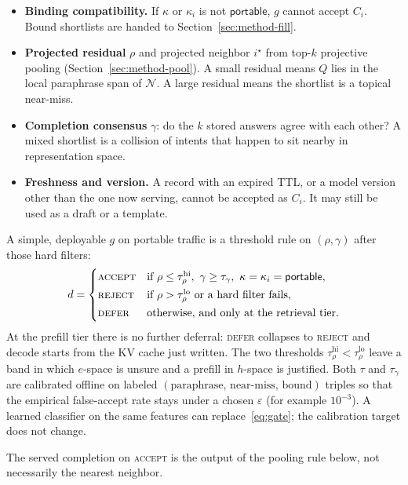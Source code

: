 \begin{itemize}
  \item \textbf{Binding compatibility.} If $\kappa$ or $\kappa_i$ is not $\mathsf{portable}$, $g$ cannot accept $C_i$. Bound shortlists are handed to Section~\ref{sec:method-fill}.
  \item \textbf{Projected residual} $\rho$ and projected neighbor $i^\star$ from top-$k$ projective pooling (Section~\ref{sec:method-pool}). A small residual means $Q$ lies in the local paraphrase span of $\mathcal{N}$. A large residual means the shortlist is a topical near-miss.
  \item \textbf{Completion consensus} $\gamma$: do the $k$ stored answers agree with each other? A mixed shortlist is a collision of intents that happen to sit nearby in representation space.
  \item \textbf{Freshness and version.} A record with an expired TTL, or a model version other than the one now serving, cannot be accepted as $C_i$. It may still be used as a draft or a template.
\end{itemize}

A simple, deployable $g$ on portable traffic is a threshold rule on $(\rho,\gamma)$ after those hard filters:
\begin{equation}
\label{eq:gate}
d
  =
  \begin{cases}
    \textsc{accept}
      & \text{if }\rho\le\tau_\rho^{\mathrm{hi}},\ \gamma\ge\tau_\gamma,\ \kappa=\kappa_i=\mathsf{portable},\\[2pt]
    \textsc{reject}
      & \text{if }\rho>\tau_\rho^{\mathrm{lo}}\ \text{or a hard filter fails},\\[2pt]
    \textsc{defer}
      & \text{otherwise, and only at the retrieval tier.}
  \end{cases}
\end{equation}
At the prefill tier there is no further deferral: \textsc{defer} collapses to \textsc{reject} and decode starts from the KV cache just written. The two thresholds $\tau_\rho^{\mathrm{hi}}<\tau_\rho^{\mathrm{lo}}$ leave a band in which $e$-space is unsure and a prefill in $h$-space is justified. Both $\tau$ and $\tau_\gamma$ are calibrated offline on labeled \((\text{paraphrase},\,\text{near-miss},\,\text{bound})\) triples so that the empirical false-accept rate stays under a chosen $\varepsilon$ (for example $10^{-3}$). A learned classifier on the same features can replace~\eqref{eq:gate}; the calibration target does not change.

The served completion on \textsc{accept} is the output of the pooling rule below, not necessarily the nearest neighbor.

